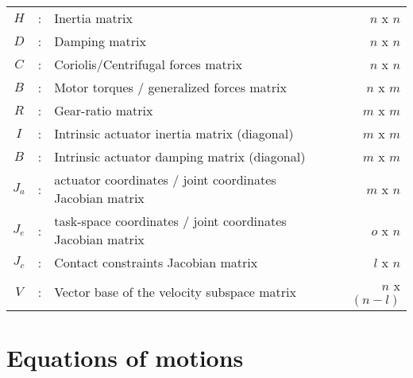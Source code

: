 \begin{table}[htbp]
\begin{tabular}{ c c l r }
			$H$             &  :  & Inertia matrix                                             & $n$ x $n$ \\
			$D$             &  :  & Damping matrix                                             & $n$ x $n$ \\
			$C$             &  :  & Coriolis/Centrifugal forces matrix                         & $n$ x $n$ \\
			$B$             &  :  & Motor torques / generalized forces matrix                  & $n$ x $m$ \\
			$R$             &  :  & Gear-ratio matrix                                          & $m$ x $m$ \\
			$I$             &  :  & Intrinsic actuator inertia matrix (diagonal)               & $m$ x $m$ \\
			$B$             &  :  & Intrinsic actuator damping matrix (diagonal)               & $m$ x $m$ \\
			$J_a$           &  :  & actuator coordinates / joint coordinates Jacobian matrix   & $m$ x $n$ \\
			$J_e$           &  :  & task-space coordinates / joint coordinates Jacobian matrix & $o$ x $n$ \\
			$J_c$           &  :  & Contact constraints Jacobian matrix                        & $l$ x $n$ \\ 
			$V$             &  :  & Vector base of the velocity subspace matrix                & $n$ x $(n-l)$ \\ 
		\hline \hline
        \end{tabular}		
	\label{tab:nom}
\end{table}

\section{Equations of motions}
\label{sec:eom}

